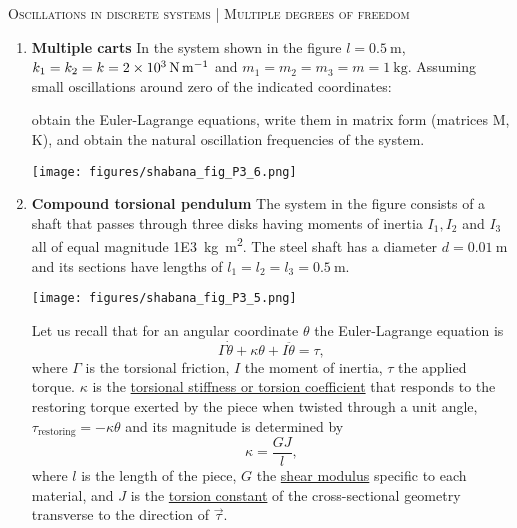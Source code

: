 \documentclass[11pt, english, a4paper, twopage]{article}
\begin{document}
\begin{center}
 \textsc{\large Oscillations in discrete systems | Multiple degrees of freedom}
\end{center}
\begin{enumerate}
\item
\begin{minipage}[t][4cm]{0.65\textwidth}
 \textbf{Multiple carts}
 In the system shown in the figure \(l = \SI{0.5}{\metre}\), \(k_1 = k_2 = k = \SI{2E3}{\newton\per\metre}\) and \(m_1 = m_2 = m_3 = m = \SI{1}{\kilo\gram}\).
 Assuming small oscillations around zero of the indicated coordinates:
 \begin{tasks}
 \task obtain the Euler-Lagrange equations,
 \task write them in matrix form (matrices M, K), and
 \task obtain the natural oscillation frequencies of the system.
 \end{tasks}
\end{minipage}
\begin{minipage}[c][0cm][t]{0.3\textwidth}
 \texttt{[image: figures/shabana\_fig\_P3\_6.png]}
\end{minipage}
\item
\begin{minipage}[t][2.5cm]{0.65\textwidth}
 \textbf{Compound torsional pendulum}
 The system in the figure consists of a shaft that passes through three disks having moments of inertia \(I_1, I_2\) and \(I_3\) all of equal magnitude \SI{1E3}{\kilo\gram\metre\squared}.
 The steel shaft has a diameter \(d = \SI{0.01}{\metre}\) and its sections have lengths of \(l_1 = l_2 = l_3 = \SI{0.5}{\metre}\).
\end{minipage}
\begin{minipage}[c][1cm][t]{0.3\textwidth}
 \texttt{[image: figures/shabana\_fig\_P3\_5.png]}
\end{minipage}
Let us recall that for an angular coordinate \(\theta\) the Euler-Lagrange equation is
\[
 \Gamma \dot{\theta} + \kappa \theta + I \ddot{\theta} = \tau,
\]
where \(\Gamma\) is the torsional friction, \(I\) the moment of inertia, \(\tau\) the applied torque.
$\kappa$ is the \href{https://en.wikipedia.org/wiki/Torsion_spring#Torsion_coefficient}{torsional stiffness or torsion coefficient} that responds to the restoring torque exerted by the piece when twisted through a unit angle, $\tau_\text{restoring} = - \kappa \theta$ and its magnitude is determined by
\[
 \kappa = \frac{G J}{l},
\]
where \(l\) is the length of the piece, \(G\) the \href{https://en.wikipedia.org/wiki/Shear_modulus}{shear modulus} specific to each material, and \(J\) is the \href{https://en.wikipedia.org/wiki/Torsion_constant}{torsion constant} of the cross-sectional geometry transverse to the direction of $\vec{\tau}$.

\end{enumerate}
\end{document}

